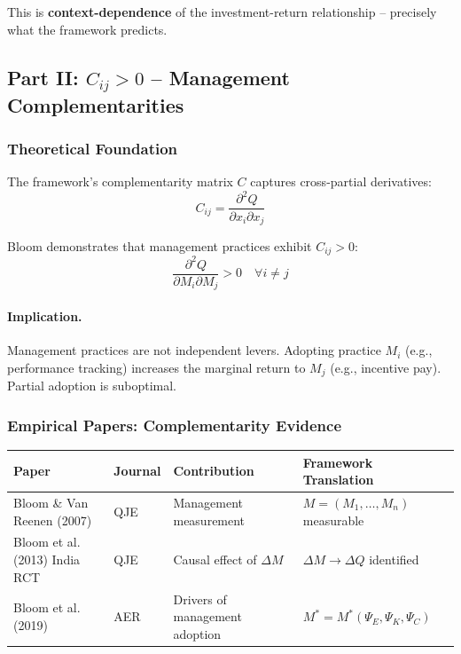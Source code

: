 This is \textbf{context-dependence} of the investment-return relationship – 
precisely what the framework predicts.

\subsection{Part II: $C_{ij} > 0$ – Management Complementarities}

\subsubsection{Theoretical Foundation}

The framework's complementarity matrix $C$ captures cross-partial derivatives:
\begin{equation}
C_{ij} = \frac{\partial^2 Q}{\partial x_i \partial x_j}
\end{equation}

Bloom demonstrates that management practices exhibit $C_{ij} > 0$:
\begin{equation}
\boxed{
\frac{\partial^2 Q}{\partial M_i \partial M_j} > 0 \quad \forall i \neq j
}
\label{eq:bloom-complementarity}
\end{equation}

\paragraph{Implication.}
Management practices are not independent levers. Adopting practice $M_i$ 
(e.g., performance tracking) increases the marginal return to $M_j$ 
(e.g., incentive pay). Partial adoption is suboptimal.

\subsubsection{Empirical Papers: Complementarity Evidence}

\begin{center}
\small
\renewcommand{\arraystretch}{1.3}
\begin{tabular}{|p{3.5cm}|p{2cm}|p{4cm}|p{4cm}|}
\hline
\textbf{Paper} & \textbf{Journal} & \textbf{Contribution} & \textbf{Framework Translation} \\
\hline
Bloom \& Van Reenen (2007) & QJE & Management measurement & $M = (M_1, \ldots, M_n)$ measurable \\
\hline
Bloom et al. (2013) India RCT & QJE & Causal effect of $\Delta M$ & $\Delta M \to \Delta Q$ identified \\
\hline
Bloom et al. (2019) & AER & Drivers of management adoption & $M^* = M^*(\Psi_E, \Psi_K, \Psi_C)$ \\
\hline
\end{tabular}
\end{center}

